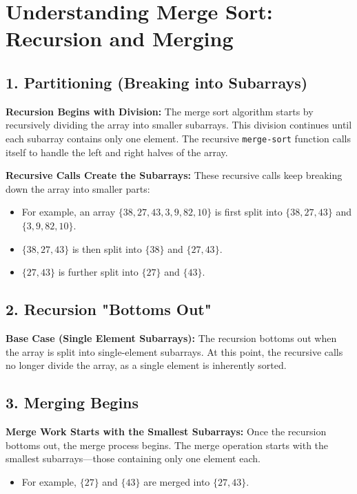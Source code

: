 \documentclass{article}
\begin{document}
\section*{Understanding Merge Sort: Recursion and Merging}

\subsection*{1. Partitioning (Breaking into Subarrays)}
\textbf{Recursion Begins with Division:} The merge sort algorithm starts by recursively dividing the array into smaller subarrays. This division continues until each subarray contains only one element. The recursive \texttt{merge-sort} function calls itself to handle the left and right halves of the array.

\textbf{Recursive Calls Create the Subarrays:} These recursive calls keep breaking down the array into smaller parts:
\begin{itemize}
    \item For example, an array \(\{38, 27, 43, 3, 9, 82, 10\}\) is first split into \(\{38, 27, 43\}\) and \(\{3, 9, 82, 10\}\).
    \item \(\{38, 27, 43\}\) is then split into \(\{38\}\) and \(\{27, 43\}\).
    \item \(\{27, 43\}\) is further split into \(\{27\}\) and \(\{43\}\).
\end{itemize}

\subsection*{2. Recursion "Bottoms Out"}
\textbf{Base Case (Single Element Subarrays):} The recursion bottoms out when the array is split into single-element subarrays. At this point, the recursive calls no longer divide the array, as a single element is inherently sorted.

\subsection*{3. Merging Begins}
\textbf{Merge Work Starts with the Smallest Subarrays:} Once the recursion bottoms out, the merge process begins. The merge operation starts with the smallest subarrays—those containing only one element each.
\begin{itemize}
    \item For example, \(\{27\}\) and \(\{43\}\) are merged into \(\{27, 43\}\).
\end{itemize}
\end{document}
